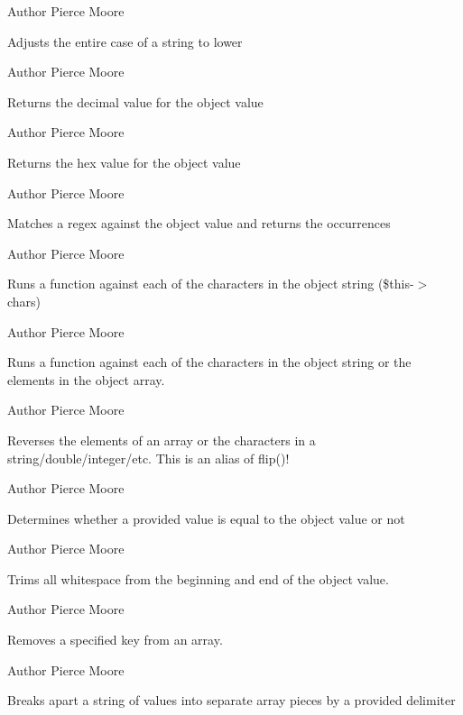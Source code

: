 \begin{DoxyAuthor}{Author}
Pierce Moore
\end{DoxyAuthor}
Adjusts the entire case of a string to lower

\begin{DoxyAuthor}{Author}
Pierce Moore
\end{DoxyAuthor}
Returns the decimal value for the object value

\begin{DoxyAuthor}{Author}
Pierce Moore
\end{DoxyAuthor}
Returns the hex value for the object value

\begin{DoxyAuthor}{Author}
Pierce Moore
\end{DoxyAuthor}
Matches a regex against the object value and returns the occurrences

\begin{DoxyAuthor}{Author}
Pierce Moore
\end{DoxyAuthor}
Runs a function against each of the characters in the object string (\$this-\/$>$chars)

\begin{DoxyAuthor}{Author}
Pierce Moore
\end{DoxyAuthor}
Runs a function against each of the characters in the object string or the elements in the object array.

\begin{DoxyAuthor}{Author}
Pierce Moore
\end{DoxyAuthor}
Reverses the elements of an array or the characters in a string/double/integer/etc. This is an alias of flip()!

\begin{DoxyAuthor}{Author}
Pierce Moore
\end{DoxyAuthor}
Determines whether a provided value is equal to the object value or not

\begin{DoxyAuthor}{Author}
Pierce Moore
\end{DoxyAuthor}
Trims all whitespace from the beginning and end of the object value.

\begin{DoxyAuthor}{Author}
Pierce Moore
\end{DoxyAuthor}
Removes a specified key from an array.

\begin{DoxyAuthor}{Author}
Pierce Moore
\end{DoxyAuthor}
Breaks apart a string of values into separate array pieces by a provided delimiter

